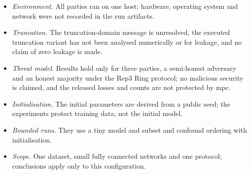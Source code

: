 \begin{itemize}
  \item \emph{Environment.} All parties ran on one host; hardware, operating system and network were not recorded in the run artifacts.
  \item \emph{Truncation.} The truncation-domain message is unresolved, the executed truncation variant has not been analysed numerically or for leakage, and no claim of zero leakage is made.
  \item \emph{Threat model.} Results hold only for three parties, a semi-honest adversary and an honest majority under the Rep3 Ring protocol; no malicious security is claimed, and the released losses and counts are not protected by \ac{mpc}.
  \item \emph{Initialisation.} The initial parameters are derived from a public seed; the experiments protect training data, not the initial model.
  \item \emph{Bounded runs.} They use a tiny model and subset and confound ordering with initialisation.
  \item \emph{Scope.} One dataset, small fully connected networks and one protocol; conclusions apply only to this configuration.
\end{itemize}
